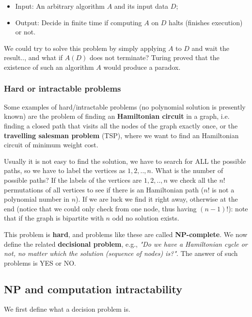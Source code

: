 \begin{itemize}
    \item Input: An arbitrary algorithm $A$ and its input data $D$;
    \item Output: Decide in finite time if computing $A$ on $D$ halts (finishes execution) or not.
\end{itemize}

We could try to solve this problem by simply applying $A$ to $D$ and wait the result.., and what if $A(D)$ does not terminate? Turing proved that the existence of such an algorithm $A$ would produce a paradox.

\subsubsection{Hard or intractable problems}
Some examples of hard/intractable problems (no polynomial solution is presently known) are the problem of finding an \textbf{Hamiltonian circuit} in a graph, i.e. finding a closed path that visits all the nodes of the graph exactly once, or the \textbf{travelling salesman problem} (TSP), where we want to find an Hamiltonian circuit of minimum weight cost.

Usually it is not easy to find the solution, we have to search for ALL the possible paths, so we have to label the vertices as $1,2, .., n$. What is the number of possible paths? If the labels of the vertices are $1,2, .., n$ we check all the $n!$ permutations of all vertices to see if there is an Hamiltonian path ($n!$ is not a polynomial number in $n$). If we are luck we find it right away, otherwise at the end (notice that we could only check from one node, thus having $(n-1)!$): note that if the graph is bipartite with $n$ odd no solution exists.

This problem is \textbf{hard}, and problems like these are called \textbf{NP-complete}. We now define the related \textbf{decisional problem}, e.g., \textit{"Do we have a Hamiltonian cycle or not, no matter which the solution (sequence of nodes) is?"}. The answer of such problems is YES or NO.

\subsection{NP and computation intractability}
We first define what a decision problem is.


